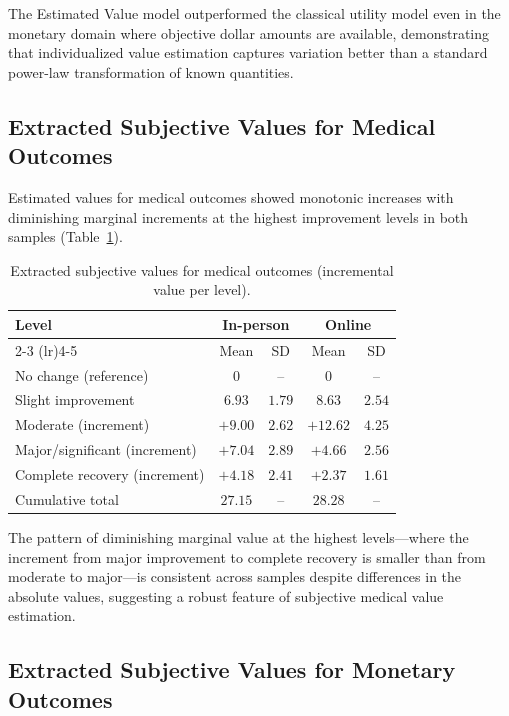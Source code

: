 \documentclass[11pt]{article}
\begin{document}
The Estimated Value model outperformed the classical utility model even in the monetary domain where objective dollar amounts are available, demonstrating that individualized value estimation captures variation better than a standard power-law transformation of known quantities.

\subsection{Extracted Subjective Values for Medical Outcomes}

Estimated values for medical outcomes showed monotonic increases with diminishing marginal increments at the highest improvement levels in both samples (Table~\ref{tab:medical_values}).

\begin{table}[H]
\centering
\caption{Extracted subjective values for medical outcomes (incremental value per level).}
\label{tab:medical_values}
\begin{tabular}{lcccc}
\toprule
\textbf{Level} & \multicolumn{2}{c}{\textbf{In-person}} & \multicolumn{2}{c}{\textbf{Online}} \\
\cmidrule(lr){2-3} \cmidrule(lr){4-5}
 & Mean & SD & Mean & SD \\
\midrule
No change (reference) & 0 & -- & 0 & -- \\
Slight improvement & $6.93$ & $1.79$ & $8.63$ & $2.54$ \\
Moderate (increment) & $+9.00$ & $2.62$ & $+12.62$ & $4.25$ \\
Major/significant (increment) & $+7.04$ & $2.89$ & $+4.66$ & $2.56$ \\
Complete recovery (increment) & $+4.18$ & $2.41$ & $+2.37$ & $1.61$ \\
Cumulative total & $27.15$ & -- & $28.28$ & -- \\
\bottomrule
\end{tabular}
\end{table}

The pattern of diminishing marginal value at the highest levels---where the increment from major improvement to complete recovery is smaller than from moderate to major---is consistent across samples despite differences in the absolute values, suggesting a robust feature of subjective medical value estimation.

\subsection{Extracted Subjective Values for Monetary Outcomes}
\end{document}

